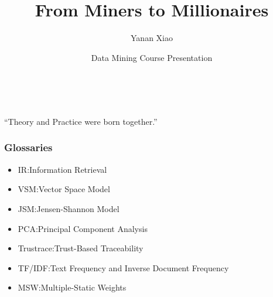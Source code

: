 \documentclass[12pt,hyperref=true,mathserif]{beamer}
\begin{document}
\title[Miners to Millionaires]{From Miners to Millionaires}
\author{Yanan Xiao}
\date[CIS501 Presentation]{Data Mining Course Presentation}

\begin{frame}
\titlepage~
\end{frame}

\begin{frame}
\tableofcontents
\end{frame}

\begin{frame}
\centering
``Theory and Practice were born together.''
\end{frame}

\begin{frame}
\frametitle{Glossaries}
\begin{itemize}
  \item IR:\@ Information Retrieval\\[6pt]
  \item VSM:\@ Vector Space Model\\[6pt]
  \item JSM:\@ Jensen-Shannon Model\\[6pt]
  \item PCA:\@ Principal Component Analysis\\[6pt]
  \item Trustrace:\@ Trust-Based Traceability\\[6pt]
  \item TF/IDF:\@ Text Frequency and Inverse Document Frequency\\[6pt]
  \item MSW:\@ Multiple-Static Weights\\[8pt]
\end{itemize}
\end{frame}
\end{document}
